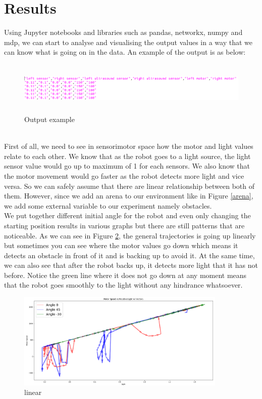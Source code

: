 \documentclass[a4paper]{article}
\begin{document}
\section{Results}
\noindent
Using Jupyter notebooks and libraries such as pandas, networkx, numpy and mdp, we can start to analyse and visualising the output values in a way that we can know what is going on in the data. An example of the output is as below:
\begin{figure}[ht!]
	\centering
	\includegraphics[width=\linewidth, height=25mm]{output_example.png}
	\caption{Output example} 
	\label{output_example}
\end{figure}
\\
First of all, we need to see in sensorimotor space how the motor and light values relate to each other. We know that as the robot goes to a light source, the light sensor value would go up to maximum of 1 for each sensors. We also know that the motor movement would go faster as the robot detects more light and vice versa. So we can safely assume that there are linear relationship between both of them. However, since we add an arena to our environment like in Figure \ref{arena}, we add some external variable to our experiment namely obstacles. 
\\\newline
We put together different initial angle for the robot and even only changing the starting position results in various graphs but there are still patterns that are noticeable. As we can see in Figure \ref{linear}, the general trajectories is going up linearly but sometimes you can see where the motor values go down which means it detects an obstacle in front of it and is backing up to avoid it. At the same time, we can also see that after the robot backs up, it detects more light that it has not before. Notice the green line where it does not go down at any moment means that the robot goes smoothly to the light without any hindrance whatsoever.
\begin{figure}[ht!]
	\centering
	\includegraphics[width=100mm]{linear.png}
	\caption{linear} 
	\label{linear}
\end{figure}
\end{document}
